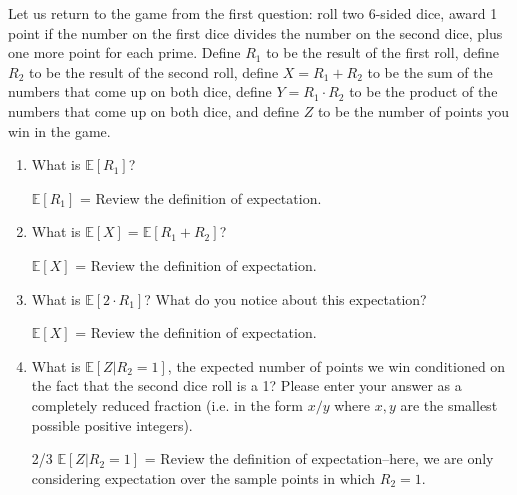 \documentclass[11pt, preview]{standalone} %
\newcommand{\E}{\mathbb{E}}
\begin{document}
\begin{enumerate}
Let us return to the game from the first question: roll two 6-sided dice, award 1 point if the number on the first dice divides the number on the second dice, plus one more point for each prime. Define $R_1$ to be the result of the first roll, define $R_2$ to be the result of the second roll, define $X = R_1 + R_2$ to be the sum of the numbers that come up on both dice, define $Y = R_1 \cdot R_2$ to be the product of the numbers that come up on both dice, and define $Z$ to be the number of points you win in the game.
\begin{enumerate}
\item What is $\E[R_1]$?
\begin{Freeform}{3.5}
$\E[R_1]$ = 
\Hint Review the definition of expectation.
\end{Freeform}
\item What is $\E[X] = \E[R_1 + R_2]$?
\begin{Freeform}{7}
$\E[X]$ = 
\Hint Review the definition of expectation.
\end{Freeform}
\item What is $\E[2\cdot R_1]$? What do you notice about this expectation?
\begin{Freeform}{7}
$\E[X]$ = 
\Hint Review the definition of expectation.
\end{Freeform}
\item What is $\E[Z | R_2 = 1]$, the expected number of points we win conditioned on the fact that the second dice roll is a 1? Please enter your answer as a completely reduced fraction (i.e. in the form $x/y$ where $x,y$ are the smallest possible positive integers).
\begin{Freeform}{2/3}
$\E[Z | R_2 = 1]$ = 
\Hint Review the definition of expectation--here, we are only considering expectation over the sample points in which $R_2 = 1$.
\end{Freeform}
\end{enumerate}

\end{enumerate}
\end{document}
